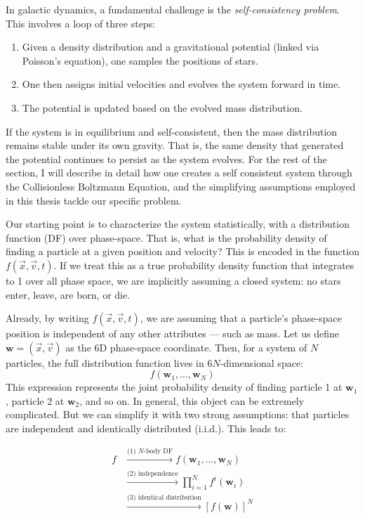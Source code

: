         In galactic dynamics, a fundamental challenge is the \textit{self-consistency problem}. This involves a loop of three steps:  
        \begin{enumerate}
            \item Given a density distribution and a gravitational potential (linked via Poisson's equation), one samples the positions of stars.  
            \item One then assigns initial velocities and evolves the system forward in time.  
            \item The potential is updated based on the evolved mass distribution.
        \end{enumerate}

        If the system is in equilibrium and self-consistent, then the mass distribution remains stable under its own gravity. That is, the same density that generated the potential continues to persist as the system evolves. For the rest of the section, I will describe in detail how one creates a self consistent system through the Collisionless Boltzmann Equation, and the simplifying assumptions employed in this thesis tackle our specific problem.

        Our starting point is to characterize the system statistically, with a distribution function (DF) over phase-space. That is, what is the probability density of finding a particle at a given position and velocity? This is encoded in the function \( f(\vec{x}, \vec{v}, t) \). If we treat this as a true probability density function that integrates to 1 over all phase space, we are implicitly assuming a closed system: no stars enter, leave, are born, or die.

        Already, by writing \( f(\vec{x}, \vec{v}, t) \), we are assuming that a particle's phase-space position is independent of any other attributes — such as mass. Let us define \( \mathbf{w} = (\vec{x}, \vec{v}) \) as the 6D phase-space coordinate. Then, for a system of \( N \) particles, the full distribution function lives in \(6N\)-dimensional space:  
        \[
        f(\mathbf{w}_1, \dots, \mathbf{w}_N)
        \]  
        This expression represents the joint probability density of finding particle 1 at \( \mathbf{w}_1 \), particle 2 at \( \mathbf{w}_2 \), and so on. In general, this object can be extremely complicated. But we can simplify it with two strong assumptions: that particles are independent and identically distributed (i.i.d.). This leads to:

        \[
        \begin{array}{rl}
        f 
        & \stackrel{\text{(1) $N$-body DF}}{\longrightarrow} 
        f(\mathbf{w}_1, \dots, \mathbf{w}_N) \\[2ex]
        & \stackrel{\text{(2) independence}}{\longrightarrow} 
        \prod_{i=1}^N f^i(\mathbf{w}_i) \\[2ex]
        & \stackrel{\text{(3) identical distribution}}{\longrightarrow} 
        \left[ f(\mathbf{w}) \right]^N
        \end{array}
        \]

